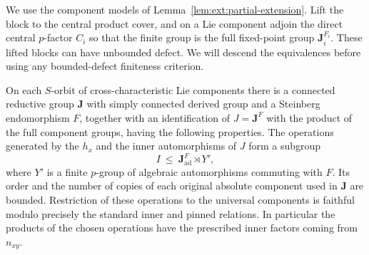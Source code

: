 We use the component models of Lemma~\ref{lem:ext:partial-extension}.
Lift the block to the central product cover, and on a Lie component adjoin
the direct central $p$-factor $C_i$ so that the finite group is the full
fixed-point group $\mathbf J_i^{F_i}$.  These lifted blocks can have
unbounded defect.  We will descend the equivalences before using any
bounded-defect finiteness criterion.

\begin{lemma}\label{per:algebraic-action}
On each $S$-orbit of cross-characteristic Lie components there is a
connected reductive group $\mathbf J$ with simply connected derived
group and a Steinberg endomorphism $F$, together with an identification
of $J=\mathbf J^F$ with the product of the full component groups, having
the following properties.
The operations generated by the $h_x$ and the inner automorphisms of
$J$ form a subgroup
\[
 I\ \leq\ \mathbf J_{\mathrm{ad}}^F\rtimes Y',
\]
where $Y'$ is a finite $p$-group of algebraic automorphisms commuting with
$F$.  Its order and the number of copies of each original absolute
component used in $\mathbf J$ are bounded.  Restriction of these
operations to the universal components is faithful modulo precisely
the standard inner and pinned relations.  In particular the products
of the chosen operations have the prescribed inner factors coming from
$n_{xy}$.
\end{lemma}


